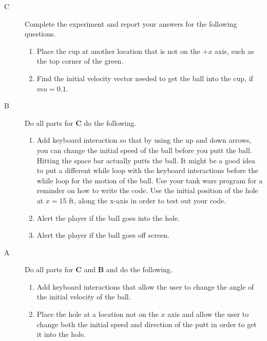 \report

\begin{description}

\item[C]  Complete the experiment and report your answers for the following questions.

\begin{enumerate}
	 \item Place the cup at another location that is not on the $+x$ axis, such as the top corner of the green.
	 \item Find the initial velocity vector needed to get the ball into the cup, if $mu=0.1$.
\end{enumerate}

\item[B] Do all parts for {\bf C} do the following.

\begin{enumerate}
 \item Add keyboard interaction so that by using the up and down arrows, you can change the initial speed of the ball before you putt the ball. Hitting the space bar actually putts the ball. It might be a good idea to put a different while loop with the keyboard interactions before the while loop for the motion of the ball. Use your tank wars program for a reminder on how to write the code. Use the initial position of the hole at $x=15$ ft, along the x-axis in order to test out your code.
 \item Alert the player if the ball goes into the hole.
 \item Alert the player if the ball goes off screen.
\end{enumerate}

\item[A] Do all parts for {\bf C} and {\bf B} and do the following.

\begin{enumerate}
 \item Add keyboard interactions that allow the user to change the angle of the initial velocity of the ball.
 \item Place the hole at a location not on the $x$ axis and allow the user to change both the initial speed and direction of the putt in order to get it into the hole.
\end{enumerate}
\end{description}